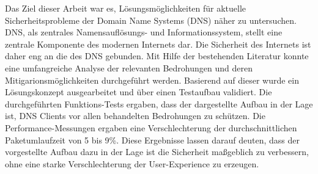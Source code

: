 
Das Ziel dieser Arbeit war es, Lösungsmöglichkeiten für aktuelle Sicherheitsprobleme der Domain Name Systems (DNS) näher zu untersuchen. DNS, als zentrales Namensauflösungs- und Informationssystem, stellt eine zentrale Komponente des modernen Internets dar. Die Sicherheit des Internets ist daher eng an die des DNS gebunden. Mit Hilfe der bestehenden Literatur konnte eine umfangreiche Analyse der relevanten Bedrohungen und deren Mitigarionsmöglichkeiten durchgeführt werden. Basierend auf dieser wurde ein Lösungskonzept ausgearbeitet und über einen Testaufbau validiert. Die durchgeführten Funktions-Tests ergaben, dass der dargestellte Aufbau in der Lage ist, DNS Clients vor allen behandelten Bedrohungen zu schützen. Die Performance-Messungen ergaben eine Verschlechterung der durchschnittlichen Paketumlaufzeit von 5 bis 9\%. Diese Ergebnisse lassen darauf deuten, dass der vorgestellte Aufbau dazu in der Lage ist die Sicherheit maßgeblich zu verbessern, ohne eine starke Verschlechterung der User-Experience zu erzeugen.
